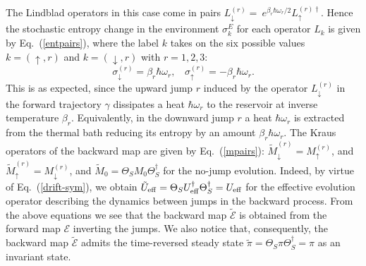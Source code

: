 \documentclass[aps,prx,twocolumn,showpacs,floatfix,superscriptaddress,graphics,longbibliography]{revtex4-1}
\newcommand{\E}{{\mathcal E}}
\begin{document}
The Lindblad operators in this case come in pairs $L_{\downarrow}^{(r)} = ~e^{\beta_r \hbar \omega_r/ 2} 
L_{\uparrow}^{(r) \dagger}$. Hence the stochastic entropy change in the environment $\sigma^E_k$ for each operator $L_k$ is given by Eq.~(\ref{entpairs}), where the label $k$ takes on the six possible values $k=(\uparrow, r)$ and $k=(\downarrow,r)$ with $r=1,2,3$:
\begin{equation}\label{sigma-r}
\sigma^{(r)}_{\downarrow} =  \beta_r \hbar \omega_r, ~~~~ \sigma^{(r)}_{\uparrow} =  -\beta_r \hbar \omega_r.
\end{equation}
This is as expected, since the upward jump $r$ induced by the operator $L^{(r)}_{\downarrow}$ in the forward trajectory $\gamma$  dissipates a heat $\hbar\omega_r$ to  the reservoir at inverse temperature $\beta_r$. Equivalently, in the downward jump  $r$ a heat $\hbar\omega_r$ is extracted from the thermal bath reducing its entropy by an amount $\beta_r\hbar\omega_r$. 
The Kraus operators of the backward map are given by Eq.~(\ref{mpairs}): 
$\tilde{M}_\downarrow^{(r)} =  M_\uparrow^{(r)}$, and $\tilde{M}_\uparrow^{(r)} =   M_\downarrow^{(r)}$,
and $\tilde{M}_0 = \Theta_S M_0 \Theta_S^\dagger$ for the no-jump evolution. Indeed, by virtue of Eq.~(\ref{drift-sym}), we obtain 
$\tilde{U}_{\rm eff} = \Theta_S U_{\rm eff}^\dagger \Theta_S^\dagger = U_{\rm eff}$ for the effective evolution operator describing the dynamics between 
jumps in the backward process. From the above equations we see that the backward map $\tilde{\E}$ is obtained from the forward map  $\E$ inverting the jumps. We also notice that, consequently, 
the backward map $\tilde{\E}$ admits the time-reversed steady state $\tilde{\pi} = \Theta_S \pi \Theta_S^\dagger = \pi$ as an invariant state.
\end{document}
